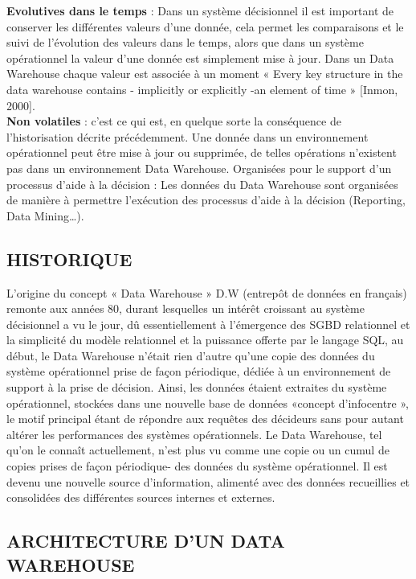\textbf{Evolutives dans le temps} : Dans un système décisionnel il est important de conserver les différentes valeurs d’une donnée, cela permet les comparaisons et le suivi de l’évolution des valeurs dans le temps, alors que dans un système opérationnel la valeur d’une donnée est simplement mise à jour. Dans un Data Warehouse chaque valeur est associée à un moment
« Every key structure in the data warehouse contains - implicitly or explicitly -an element of time » [Inmon, 2000].\\

\textbf{Non volatiles} : c’est ce qui est, en quelque sorte la conséquence de l’historisation décrite précédemment. Une donnée dans un environnement opérationnel peut être mise à jour ou supprimée, de telles opérations n’existent pas dans un environnement Data Warehouse. Organisées pour le support d’un processus d’aide à la décision : Les données du Data Warehouse sont organisées de manière à permettre l’exécution des processus d’aide à la décision (Reporting, Data Mining…).

 \subsection{HISTORIQUE}
 	L’origine du concept « Data Warehouse » D.W (entrepôt de données en français) remonte aux années 80, durant lesquelles un intérêt croissant au système décisionnel a vu le jour, dû essentiellement à l’émergence des SGBD relationnel et la simplicité du modèle relationnel et la puissance offerte par le langage SQL, au début, le Data Warehouse n’était rien d’autre qu’une copie des données du système opérationnel prise de façon périodique, dédiée à un environnement de support à la prise de décision. Ainsi, les données étaient extraites du système opérationnel, stockées dans une nouvelle base de données «concept d’infocentre », le motif principal étant de répondre aux requêtes des décideurs sans pour autant altérer les performances des systèmes opérationnels. Le Data Warehouse, tel qu’on le connaît actuellement, n’est plus vu comme une copie ou un cumul de copies prises de façon périodique- des données du système opérationnel. Il est devenu une nouvelle source d’information, alimenté avec des données recueillies et consolidées des différentes sources internes et externes.
 
 \subsection{ARCHITECTURE D’UN DATA WAREHOUSE}
 

